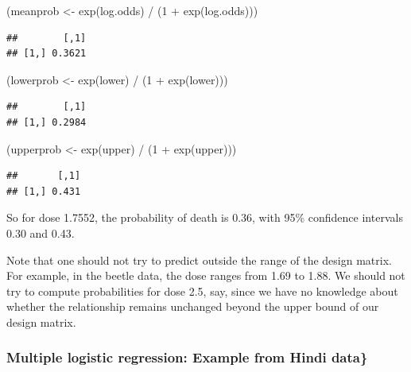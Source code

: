\documentclass[
  12pt,
]{krantz}
\newenvironment{Shaded}{\begin{snugshade}}{\end{snugshade}}
\newcommand{\DecValTok}[1]{\textcolor[rgb]{0.00,0.00,0.81}{#1}}
\newcommand{\FunctionTok}[1]{\textcolor[rgb]{0.00,0.00,0.00}{#1}}
\newcommand{\NormalTok}[1]{#1}
\newcommand{\OtherTok}[1]{\textcolor[rgb]{0.56,0.35,0.01}{#1}}
\newcommand{\SpecialCharTok}[1]{\textcolor[rgb]{0.00,0.00,0.00}{#1}}
\theoremstyle{definition}
\theoremstyle{definition}
\theoremstyle{definition}
\theoremstyle{definition}
\theoremstyle{remark}
\begin{document}
\begin{Shaded}
\begin{Highlighting}[]
\NormalTok{(meanprob }\OtherTok{\textless{}{-}} \FunctionTok{exp}\NormalTok{(log.odds) }\SpecialCharTok{/}\NormalTok{ (}\DecValTok{1} \SpecialCharTok{+} \FunctionTok{exp}\NormalTok{(log.odds)))}
\end{Highlighting}
\end{Shaded}

\begin{verbatim}
##        [,1]
## [1,] 0.3621
\end{verbatim}

\begin{Shaded}
\begin{Highlighting}[]
\NormalTok{(lowerprob }\OtherTok{\textless{}{-}} \FunctionTok{exp}\NormalTok{(lower) }\SpecialCharTok{/}\NormalTok{ (}\DecValTok{1} \SpecialCharTok{+} \FunctionTok{exp}\NormalTok{(lower)))}
\end{Highlighting}
\end{Shaded}

\begin{verbatim}
##        [,1]
## [1,] 0.2984
\end{verbatim}

\begin{Shaded}
\begin{Highlighting}[]
\NormalTok{(upperprob }\OtherTok{\textless{}{-}} \FunctionTok{exp}\NormalTok{(upper) }\SpecialCharTok{/}\NormalTok{ (}\DecValTok{1} \SpecialCharTok{+} \FunctionTok{exp}\NormalTok{(upper)))}
\end{Highlighting}
\end{Shaded}

\begin{verbatim}
##       [,1]
## [1,] 0.431
\end{verbatim}

So for dose 1.7552, the probability of death is 0.36,
with 95\% confidence intervals 0.30 and
0.43.

Note that one should not try to predict outside the range of the design matrix. For example, in the beetle data, the dose ranges from 1.69 to 1.88. We should not try to compute probabilities for dose 2.5, say, since we have no knowledge about whether the relationship remains unchanged beyond the upper bound of our design matrix.

\hypertarget{multiple-logistic-regression-example-from-hindi-data}{%
\subsubsection{Multiple logistic regression: Example from Hindi data\}}\label{multiple-logistic-regression-example-from-hindi-data}}
\end{document}
